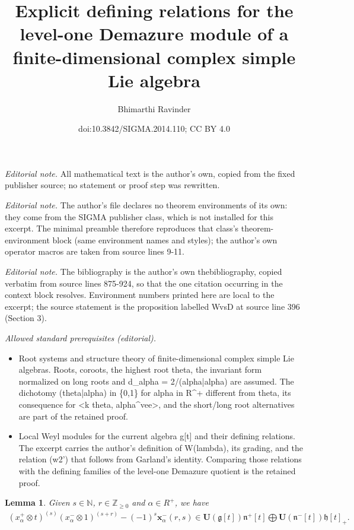 \documentclass[10pt,a4paper]{amsart}
\title{Explicit defining relations for the level-one Demazure module of a finite-dimensional complex simple Lie algebra}
\author{Bhimarthi Ravinder}
\date{doi:10.3842/SIGMA.2014.110; CC BY 4.0}
\newtheorem{lemma}{Lemma}
\begin{document}
\maketitle
\noindent\textit{Editorial note.} All mathematical text is the author's own, copied from the fixed publisher source; no statement or proof step was rewritten.\par\medskip
\noindent\textit{Editorial note.} The author's file declares no theorem environments of its own: they come from the SIGMA publisher class, which is not installed for this excerpt. The minimal preamble therefore reproduces that class's theorem-environment block (same environment names and styles); the author's own operator macros are taken from source lines 9-11.\par\medskip
\noindent\textit{Editorial note.} The bibliography is the author's own thebibliography, copied verbatim from source lines 875-924, so that the one citation occurring in the context block resolves. Environment numbers printed here are local to the excerpt; the source statement is the proposition labelled WvsD at source line 396 (Section 3).\par\medskip
\noindent\textit{Allowed standard prerequisites (editorial).}\begin{itemize}
\item Root systems and structure theory of finite-dimensional complex simple Lie algebras. Roots, coroots, the highest root theta, the invariant form normalized on long roots and d\_alpha = 2/(alpha|alpha) are assumed. The dichotomy (theta|alpha) in \{0,1\} for alpha in R\textasciicircum{}+ different from theta, its consequence for <k theta, alpha\textasciicircum{}vee>, and the short/long root alternatives are part of the retained proof.
\item Local Weyl modules for the current algebra g[t] and their defining relations. The excerpt carries the author's definition of W(lambda), its grading, and the relation (w2') that follows from Garland's identity. Comparing those relations with the defining families of the level-one Demazure quotient is the retained proof.
\end{itemize}\medskip
\begin{lemma}\label{garland}
Given $s\in\mathbb{N}$, $r\in\mathbb{Z}_{\geq0}$ and $\alpha\in R^{+}$, we have
\begin{gather*}
(x^{+}_{\alpha} \otimes t)^{(s)}(x^{-}_{\alpha} \otimes
1)^{(s+r)}-(-1)^s\mathbf{x}^{-}_{\alpha}(r,s)\in\mathbf{U}(\mathfrak{g}[t])\mathfrak{n}^{+}[t]\bigoplus
\mathbf{U}(\mathfrak{n}^{-}[t])\mathfrak{h}[t]_{+}.
\end{gather*}
\end{lemma}
\end{document}
